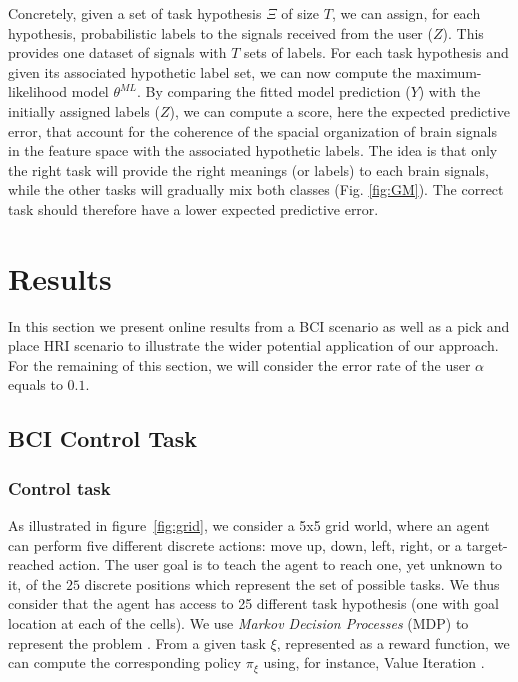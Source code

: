 \documentclass[conference]{IEEEtran}
\begin{document}
Concretely, given a set of task hypothesis $\Xi$ of size $T$, we can assign, for each hypothesis, probabilistic labels to the signals received from the user ($Z$). This provides one dataset of signals with $T$ sets of labels. For each task hypothesis and given its associated hypothetic label set, we can now compute the maximum-likelihood model $\theta^{ML}$. By comparing the fitted model prediction ($Y$) with the initially assigned labels ($Z$), we can compute a score, here  the expected predictive error, that account for the coherence of the spacial organization of brain signals in the feature space with the associated hypothetic labels. The idea is that only the right task will provide the right meanings (or labels) to each brain signals, while the other tasks will gradually mix both classes (Fig. \ref{fig:GM}). The correct task should therefore have a lower expected predictive error.

\section{Results}

In this section we present online results from a BCI scenario as well as a pick and place HRI scenario to illustrate the wider potential application of our approach. For the remaining of this section, we will consider the error rate of the user $\alpha$ equals to $0.1$.

\subsection{BCI Control Task}

\subsubsection{Control task}
As illustrated in figure~\ref{fig:grid}, we consider a 5x5 grid world, where an agent can perform five different discrete actions: move up, down, left, right, or a target-reached action. The user goal is to teach the agent to reach one, yet unknown to it, of the $25$ discrete positions which represent the set of possible tasks. We thus consider that the agent has access to 25 different task hypothesis (one with goal location at each of the cells). We use \textit{Markov Decision Processes} (MDP) to represent the problem \cite{sutton1998reinforcement}. From a given task $\xi$, represented as a reward function, we can compute the corresponding policy $\pi_{\xi}$ using, for instance, Value Iteration \cite{sutton1998reinforcement}. 
%
\end{document}
